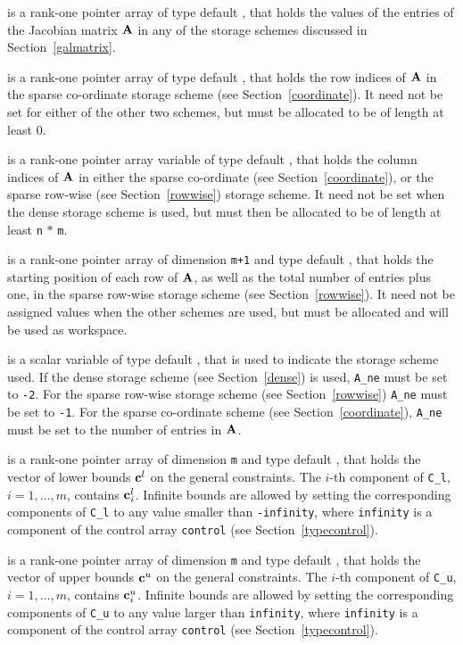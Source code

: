 \documentclass{galahad}
\begin{document}
\begin{description}
 is a rank-one pointer array of type default \realdp, that holds
the values of the entries of the Jacobian matrix ${\mathbf{A}}$ in any of the 
storage schemes discussed in Section~\ref{galmatrix}.

 is a rank-one pointer array of type default \integer,
that holds the row indices  of ${\mathbf{A}}$ in the sparse co-ordinate storage
scheme (see Section~\ref{coordinate}). 
It need not be set for either of the other
two schemes, but must be allocated to be of length at least 0.

 is a rank-one pointer array variable of type default \integer,
that holds the column indices  of ${\mathbf{A}}$ in either the sparse co-ordinate 
(see Section~\ref{coordinate}), or the sparse row-wise 
(see Section~\ref{rowwise}) storage scheme.
It need not be set when the dense storage scheme is used,
but must then be allocated to be of length at least {\tt n} $\ast$ {\tt m}.

 is a rank-one pointer array of dimension {\tt m+1} and type 
default \integer, that holds the 
starting position of each row of ${\mathbf{A}}$, as well
as the total number of entries plus one, in the sparse row-wise storage
scheme (see Section~\ref{rowwise}). It need not be assigned values when the
other schemes are used, but must be allocated and will be used as
workspace.

 is a scalar variable of type default \integer, that is used to
indicate the storage scheme used. If the dense storage scheme 
(see Section~\ref{dense}) is used, {\tt A\_ne} must be set to {\tt -2}. 
For the sparse row-wise storage scheme (see Section~\ref{rowwise}) 
{\tt A\_ne} must be set to {\tt -1}.
For the sparse co-ordinate scheme (see Section~\ref{coordinate}), 
{\tt A\_ne} must be set to the number of entries in ${\mathbf{A}}$.

 is a rank-one pointer array of dimension {\tt m} and type 
default \realdp, that holds the vector of lower bounds ${\mathbf{c}}^{l}$ 
on the general constraints. The $i$-th component of 
{\tt C\_l}, $i = 1, \ldots , m$, contains ${\mathbf{c}}_{i}^{l}$.
Infinite bounds are allowed by setting the corresponding 
components of {\tt C\_l} to any value smaller than {\tt -infinity}, 
where {\tt infinity} is a component of the control array {\tt control} 
(see Section~\ref{typecontrol}).

 is a rank-one pointer array of dimension {\tt m} and type 
default \realdp, that holds the vector of upper bounds ${\mathbf{c}}^{u}$ 
on the general constraints. The $i$-th component of 
{\tt C\_u}, $i = 1,  \ldots ,  m$, contains ${\mathbf{c}}_{i}^{u}$.
Infinite bounds are allowed by setting the corresponding 
components of {\tt C\_u} to any value larger than {\tt infinity}, 
where {\tt infinity} is a component of the control array {\tt control} 
(see Section~\ref{typecontrol}).


\end{description}
\end{document}
